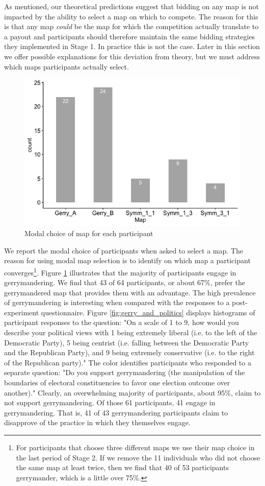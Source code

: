 \documentclass[AER]{AEA}
\begin{document}
As mentioned, our theoretical predictions suggest that bidding on any map is not impacted by the ability to select a map on which to compete. The reason for this is that any map \emph{could} be the map for which the competition actually translate to a payout and participants should therefore maintain the same bidding strategies they implemented in Stage 1. In practice this is not the case. Later in this section we offer possible explanations for this deviation from theory, but we must address which maps participants actually select.
\begin{figure}[h]
\centering
\includegraphics[scale=0.5]{map_choice_stage_2.jpeg}
\caption{Modal choice of map for each participant}
\label{fig:map_choice_stage_2}
\end{figure}
We report the modal choice of participants when asked to select a map. The reason for using modal map selection is to identify on which map a participant converges\footnote{For participants that choose three different maps we use their map choice in the last period of Stage 2. If we remove the 11 individuals who did not choose the same map at least twice, then we find that 40 of 53 participants gerrymander, which is a little over 75\%.}. Figure \ref{fig:map_choice_stage_2} illustrates that the majority of participants engage in gerrymandering. We find that 43 of 64 participants, or about 67\%, prefer the gerrymandered map that provides them with an advantage. The high prevalence of gerrymandering is interesting when compared with the responses to a post-experiment questionnaire. Figure \ref{fig:gerry_and_politics} displays histograms of participant responses to the question: "On a scale of 1 to 9, how would you describe your political views with 1 being extremely liberal (i.e. to the left of the Democratic Party), 5 being centrist (i.e. falling between the Democratic Party and the Republican Party), and 9 being extremely conservative (i.e. to the right of the Republican party)." The color identifies participants who responded to a separate question: "Do you support gerrymandering (the manipulation of the boundaries of electoral constituencies to favor one election outcome over another)." Clearly, an overwhelming majority of participants, about 95\%, claim to not support gerrymandering. Of those 61 participants, 41 engage in gerrymandering. That is, 41 of 43 gerrymandering participants claim to disapprove of the practice in which they themselves engage.
\end{document}
